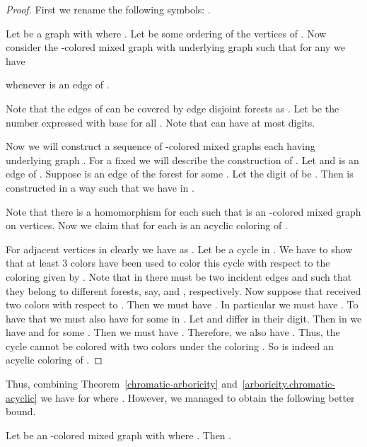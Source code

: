 \documentclass[11pt]{article}
\begin{document}
\begin{proof}
First we rename the following symbols:  
.

Let  be a graph with  where .
Let  be some ordering of the vertices of . 
Now consider the -colored mixed graph  with underlying graph  such that for any  we have 
 
whenever  is 
an edge of . 

Note that the edges of   can be covered by  edge disjoint forests  as . 
Let  be the number  expressed with base 
for all . Note that  can have at most  digits. 


  Now we will construct a sequence of -colored mixed graphs  each having underlying graph . 
  For a fixed  we will describe the construction of .   
  Let  and  is an edge of . 
  Suppose  is an edge of the forest  for some .
  Let the  digit of   be . Then   is constructed in a way such that 
  we have  in .
  
  Note that there is a homomorphism   for each  such that  is 
  an -colored mixed graph on  vertices. 
  Now we claim that  for each  is an acyclic coloring of . 
  
  For adjacent vertices  in  clearly we have  as . 
  Let  be a cycle in . We have to show that at least 3 colors have been used to color this cycle with respect to the coloring given by . 
  Note that in  there must be two incident edges  and  such that they belong to different forests, 
  say,  and , respectively.
 Now suppose that  received two colors with respect to . Then we must have . In particular we must have 
 . 
 To have that we must also have  for some  in . 
 Let   and  differ in their  digit. Then in  we have  and 
 for some . Then we must have .  Therefore, we also have . Thus, the cycle  cannot be colored with two colors under the coloring . So  is indeed an acyclic coloring of . 
    \end{proof}


Thus, combining   Theorem~\ref{chromatic-arboricity} and~\ref{arboricity.chromatic-acyclic} we have 
 for  where . 
However,  we managed to obtain the following better bound.


\begin{theorem}\label{chromatic-acyclic}
Let  be an -colored mixed graph with   where .  Then 
.
\end{theorem}
\end{document}

